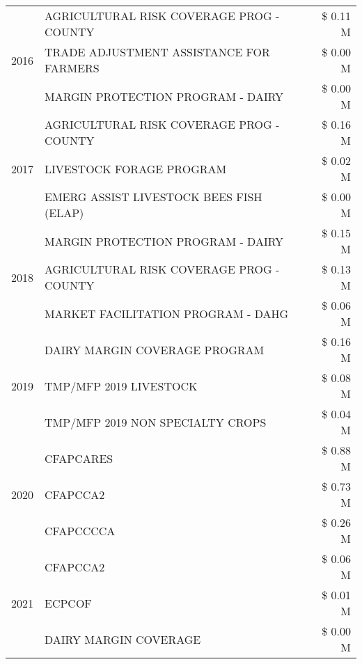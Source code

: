 \begin{tabular}{llr}
\cline{1-3}
\multirow[t]{3}{*}{2016} & AGRICULTURAL RISK COVERAGE PROG - COUNTY & \$ 0.11 M \\
 & TRADE ADJUSTMENT ASSISTANCE FOR FARMERS & \$ 0.00 M \\
 & MARGIN PROTECTION PROGRAM - DAIRY & \$ 0.00 M \\
\cline{1-3}
\multirow[t]{3}{*}{2017} & AGRICULTURAL RISK COVERAGE PROG - COUNTY & \$ 0.16 M \\
 & LIVESTOCK FORAGE PROGRAM & \$ 0.02 M \\
 & EMERG ASSIST LIVESTOCK BEES FISH (ELAP) & \$ 0.00 M \\
\cline{1-3}
\multirow[t]{3}{*}{2018} & MARGIN PROTECTION PROGRAM - DAIRY & \$ 0.15 M \\
 & AGRICULTURAL RISK COVERAGE PROG - COUNTY & \$ 0.13 M \\
 & MARKET FACILITATION PROGRAM - DAHG & \$ 0.06 M \\
\cline{1-3}
\multirow[t]{3}{*}{2019} & DAIRY MARGIN COVERAGE PROGRAM & \$ 0.16 M \\
 & TMP/MFP 2019 LIVESTOCK & \$ 0.08 M \\
 & TMP/MFP 2019 NON SPECIALTY CROPS & \$ 0.04 M \\
\cline{1-3}
\multirow[t]{3}{*}{2020} & CFAPCARES & \$ 0.88 M \\
 & CFAPCCA2 & \$ 0.73 M \\
 & CFAPCCCCA & \$ 0.26 M \\
\cline{1-3}
\multirow[t]{3}{*}{2021} & CFAPCCA2 & \$ 0.06 M \\
 & ECPCOF & \$ 0.01 M \\
 & DAIRY MARGIN COVERAGE & \$ 0.00 M \\
\cline{1-3}
\bottomrule
\end{tabular}
